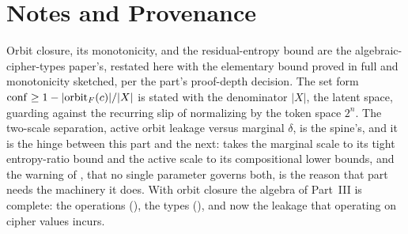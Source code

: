 \section{Notes and Provenance}
\label{sec:ch8-notes}

Orbit closure, its monotonicity, and the residual-entropy bound are the
algebraic-cipher-types paper's, restated here with the elementary bound
proved in full and monotonicity sketched, per the part's proof-depth
decision. The set form $\mathrm{conf} \ge 1 - \lvert\operatorname{orbit}_F(c)\rvert /
\lvert X\rvert$ is stated with the denominator $\lvert X\rvert$, the latent
space, guarding against the recurring slip of normalizing by the token space
$2^n$. The two-scale separation, active orbit leakage versus marginal
$\delta$, is the spine's, and it is the hinge between this part and the next:
 takes the marginal scale to its tight
entropy-ratio bound and the active scale to its compositional lower bounds,
and the warning of , that no single parameter
governs both, is the reason that part needs the machinery it does. With
orbit closure the algebra of Part~III is complete: the operations
(), the types (), and now
the leakage that operating on cipher values incurs.
